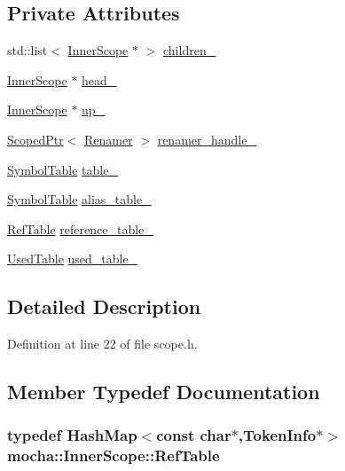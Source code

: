 \subsection*{Private Attributes}
\begin{DoxyCompactItemize}
\item 
std::list$<$ \hyperlink{classmocha_1_1_inner_scope}{InnerScope} $\ast$ $>$ \hyperlink{classmocha_1_1_inner_scope_a5a55e813df6b6b025627d51cca6394ca}{children\_\-}
\item 
\hyperlink{classmocha_1_1_inner_scope}{InnerScope} $\ast$ \hyperlink{classmocha_1_1_inner_scope_a8e92c43467292b235fcecad87195a33d}{head\_\-}
\item 
\hyperlink{classmocha_1_1_inner_scope}{InnerScope} $\ast$ \hyperlink{classmocha_1_1_inner_scope_afdd97c6336ee4055e4a6808c0f703ed5}{up\_\-}
\item 
\hyperlink{classmocha_1_1_scoped_ptr}{ScopedPtr}$<$ \hyperlink{classmocha_1_1_renamer}{Renamer} $>$ \hyperlink{classmocha_1_1_inner_scope_ae6b813153ed810a5de5376488b034066}{renamer\_\-handle\_\-}
\item 
\hyperlink{classmocha_1_1_hash_map}{SymbolTable} \hyperlink{classmocha_1_1_inner_scope_a3f02a6410742e2a6f4e7475af5fc625a}{table\_\-}
\item 
\hyperlink{classmocha_1_1_hash_map}{SymbolTable} \hyperlink{classmocha_1_1_inner_scope_af3ad716139b4b78e51110d3461be740e}{alias\_\-table\_\-}
\item 
\hyperlink{classmocha_1_1_hash_map}{RefTable} \hyperlink{classmocha_1_1_inner_scope_a4cc531e5c4964519070138ea765d310e}{reference\_\-table\_\-}
\item 
\hyperlink{classmocha_1_1_hash_map}{UsedTable} \hyperlink{classmocha_1_1_inner_scope_a099bcce3df3cfcb1bff30811156f88c3}{used\_\-table\_\-}
\end{DoxyCompactItemize}


\subsection{Detailed Description}


Definition at line 22 of file scope.h.



\subsection{Member Typedef Documentation}
\hypertarget{classmocha_1_1_inner_scope_ab9e4fc61cd423f1682a03867d1c26537}{
\subsubsection[{RefTable}]{\setlength{\rightskip}{0pt plus 5cm}typedef {\bf HashMap}$<$const char$\ast$,{\bf TokenInfo}$\ast$$>$ {\bf mocha::InnerScope::RefTable}}}
\label{classmocha_1_1_inner_scope_ab9e4fc61cd423f1682a03867d1c26537}


